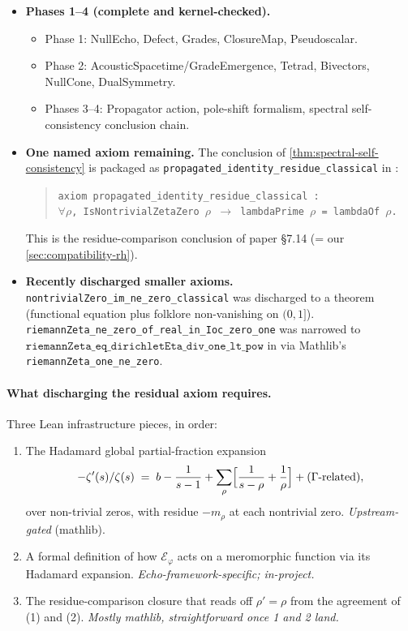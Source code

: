 \documentclass[11pt,a4paper]{article}
\theoremstyle{plain}
\theoremstyle{definition}
\theoremstyle{remark}
\numberwithin{equation}{section}
\providecommand{\vp}{\varphi}
\providecommand{\EF}{\mathcal{E}}
\begin{document}
\begin{itemize}[leftmargin=2em]
  \item \textbf{Phases 1--4 (complete and kernel-checked).}
    \begin{itemize}\itemsep0pt
      \item Phase 1: NullEcho, Defect, Grades, ClosureMap,
        Pseudoscalar.
      \item Phase 2: AcousticSpacetime/GradeEmergence, Tetrad,
        Bivectors, NullCone, DualSymmetry.
      \item Phases 3--4: Propagator action, pole-shift formalism,
        spectral self-consistency conclusion chain.
    \end{itemize}
  \item \textbf{One named axiom remaining.}
    The conclusion of \cref{thm:spectral-self-consistency} is
    packaged as \texttt{propagated\_identity\_residue\_classical}
    in \cite[\texttt{EchoRH/PropagatedIdentity.lean}]{echo-rh-lean}:
    \begin{quote}\small
    \texttt{axiom propagated\_identity\_residue\_classical : \\
    \mbox{\quad}$\forall \rho$, IsNontrivialZetaZero $\rho$ $\to$
    lambdaPrime $\rho$ = lambdaOf $\rho$.}
    \end{quote}
    This is the residue-comparison conclusion of paper \S7.14
    (= our \cref{sec:compatibility-rh}).
  \item \textbf{Recently discharged smaller axioms.}
    \texttt{nontrivialZero\_im\_ne\_zero\_classical} was
    discharged to a theorem (functional equation plus folklore
    non-vanishing on $(0, 1]$).
    \texttt{riemannZeta\_ne\_zero\_of\_real\_in\_Ioc\_zero\_one}
    was narrowed to $\mathtt{riemannZeta\_eq\_dirichletEta\_div\_one\_lt\_pow}$
    in \cite[\texttt{EchoRH/Zeta/Eta.lean}]{echo-rh-lean} via
    Mathlib's \texttt{riemannZeta\_one\_ne\_zero}.
\end{itemize}

\paragraph{What discharging the residual axiom requires.}
Three Lean infrastructure pieces, in order:
\begin{enumerate}
  \item The Hadamard global partial-fraction expansion
    \begin{equation*}
      -\zeta'(s)/\zeta(s) \;=\;
      b - \frac{1}{s-1} + \sum_\rho \Bigl[\frac{1}{s-\rho} + \frac{1}{\rho}\Bigr]
      + \text{($\Gamma$-related)},
    \end{equation*}
    over non-trivial zeros, with residue $-m_\rho$ at each
    nontrivial zero.  \emph{Upstream-gated} (mathlib).
  \item A formal definition of how $\EF_\vp$ acts on a meromorphic
    function via its Hadamard expansion.
    \emph{Echo-framework-specific; in-project.}
  \item The residue-comparison closure that reads off
    $\rho' = \rho$ from the agreement of (1) and (2).
    \emph{Mostly mathlib, straightforward once 1 and 2 land.}
\end{enumerate}
\end{document}
